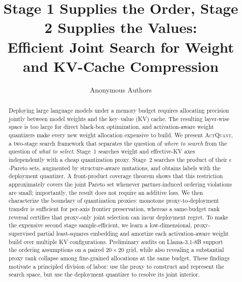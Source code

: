 \documentclass[11pt]{article}
\title{Stage 1 Supplies the Order, Stage 2 Supplies the Values:\\
Efficient Joint Search for Weight and KV-Cache Compression}
\author{Anonymous Authors}
\date{}
\newcommand{\method}{\textsc{ActQuant}}
\theoremstyle{definition}
\begin{document}
\maketitle

\begin{abstract}
Deploying large language models under a memory budget requires allocating
precision jointly between model weights and the key--value (KV) cache.  The
resulting layer-wise space is too large for direct black-box optimization, and
activation-aware weight quantizers make every new weight allocation expensive
to build.  We present \method, a two-stage search framework that separates the
question of \emph{where to search} from the question of \emph{what to select}.
Stage~1 searches weight and effective-KV axes independently with a cheap
quantization proxy.  Stage~2 searches the product of their $\epsilon$-Pareto
sets, augmented by structure-aware mutations, and obtains labels with the
deployment quantizer.  A front-product coverage theorem shows that this
restriction approximately covers the joint Pareto set whenever partner-induced
ordering violations are small; importantly, the result does not require an
additive loss.  We then characterize the boundary of quantization proxies:
monotone proxy-to-deployment transfer is sufficient for per-axis frontier
preservation, whereas a same-budget rank reversal certifies that proxy-only
joint selection can incur deployment regret.  To make the expensive second
stage sample-efficient, we learn a low-dimensional, proxy-supervised partial
least-squares embedding and amortize each activation-aware weight build over
multiple KV configurations.  Preliminary audits on Llama-3.1-8B support the
ordering assumptions on a paired $20\times20$ grid, while also revealing a
substantial proxy rank collapse among fine-grained allocations at the same
budget.  These findings motivate a principled division of labor: use the proxy
to construct and represent the search space, but use the deployment quantizer
to resolve its joint interior.
\end{abstract}







\end{document}
